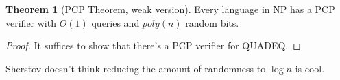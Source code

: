 \documentclass{article}
\theoremstyle{definition}
\newtheorem{theorem}{Theorem}[section]
\begin{document}
\begin{theorem}[PCP Theorem, weak version]
    Every language in NP has a PCP verifier with $O(1)$ queries and $poly(n)$ random bits.
\end{theorem}
\begin{proof}
    It suffices to show that there's a PCP verifier for QUADEQ.

    
\end{proof}

Sherstov doesn't think reducing the amount of randomness to $\log n$ is cool.

\newpage
\end{document}
